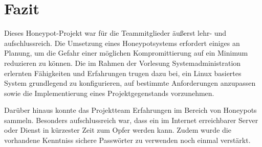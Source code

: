 \chapter{Fazit}
\label{ch:Fazit}






Dieses Honeypot-Projekt war für die Teammitglieder äußerst lehr- und aufschlussreich. Die Umsetzung eines Honeypotsystems erfordert einiges an Planung, um die Gefahr einer möglichen Kompromittierung auf ein Minimum reduzieren zu können. Die im Rahmen der Vorlesung Systemadministration erlernten Fähigkeiten und Erfahrungen trugen dazu bei, ein Linux basiertes System grundlegend zu konfigurieren, auf bestimmte Anforderungen anzupassen sowie die Implementierung eines Projektgegenstands vorzunehmen.

Darüber hinaus konnte das Projektteam Erfahrungen im Bereich von Honeypots sammeln. Besonders aufschlussreich war, dass ein im Internet erreichbarer Server oder Dienst in kürzester Zeit zum Opfer werden kann. Zudem wurde die vorhandene Kenntniss sichere Passwörter zu verwenden noch einmal verstärkt.
